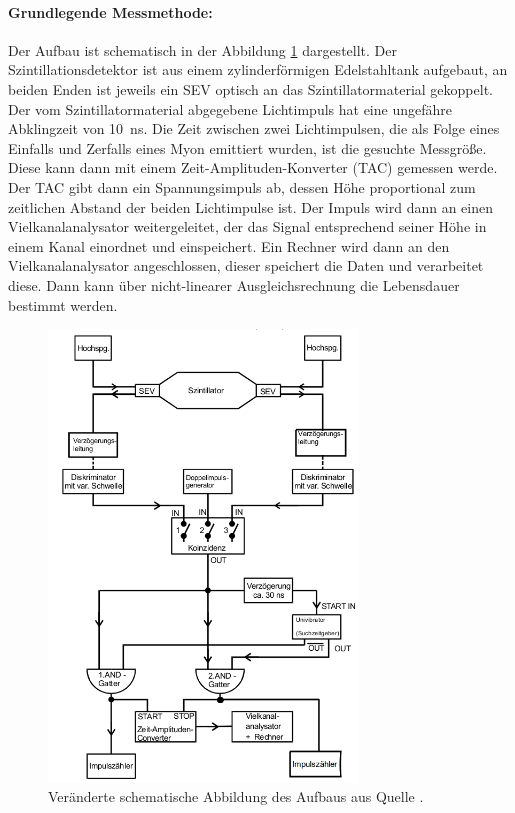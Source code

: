 \paragraph{Grundlegende Messmethode:}
Der Aufbau ist schematisch in der Abbildung \ref{fig:aufbau} dargestellt. Der Szintillationsdetektor ist aus 
einem zylinderförmigen Edelstahltank aufgebaut, an beiden Enden ist jeweils ein SEV optisch an das 
Szintillatormaterial gekoppelt. Der vom Szintillatormaterial abgegebene Lichtimpuls hat eine ungefähre  Abklingzeit von 
\SI{10}{\nano\second}. Die Zeit zwischen zwei Lichtimpulsen, die als Folge eines Einfalls und Zerfalls eines Myon 
emittiert wurden, ist die gesuchte Messgröße. Diese kann dann mit einem Zeit-Amplituden-Konverter (TAC) 
gemessen werde. Der TAC gibt dann ein Spannungsimpuls ab, dessen Höhe proportional zum zeitlichen Abstand der 
beiden Lichtimpulse ist. Der Impuls wird dann an einen Vielkanalanalysator weitergeleitet, der das Signal 
entsprechend seiner Höhe in einem Kanal einordnet und einspeichert. Ein Rechner wird dann an den 
Vielkanalanalysator angeschlossen, dieser speichert die Daten und verarbeitet diese. Dann kann über 
nicht-linearer Ausgleichsrechnung die Lebensdauer bestimmt werden.

\begin{figure}
  \centering
  \includegraphics[height=12cm]{pics/AufbauB.png}
  \caption{Veränderte schematische Abbildung des Aufbaus aus Quelle \cite{Anleitung}.}
  \label{fig:aufbau}
\end{figure}

